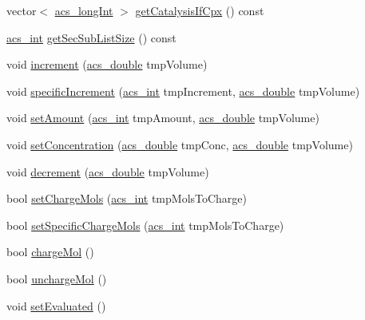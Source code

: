 \begin{DoxyCompactItemize}
vector$<$ \hyperlink{acs__headers_8h_a19319d75f02db4308bc5c0026d98cd85}{acs\-\_\-long\-Int} $>$ \hyperlink{classspecies_aaafd2738231ba916153e24c19e7b3bfc}{get\-Catalysis\-If\-Cpx} () const 
\item 
\hyperlink{acs__headers_8h_a8d277355641a098190360234e2ebde35}{acs\-\_\-int} \hyperlink{classspecies_a984df86838272204e7a8414bbc2a61fb}{get\-Sec\-Sub\-List\-Size} () const 
\item 
void \hyperlink{classspecies_a77f68017e5c50f8943df90efd2e8a0bb}{increment} (\hyperlink{acs__headers_8h_ab776853a005fcbf56af0424a2a4dd607}{acs\-\_\-double} tmp\-Volume)
\item 
void \hyperlink{classspecies_a87e85a2397e5ec34518efa235b529d7e}{specific\-Increment} (\hyperlink{acs__headers_8h_a8d277355641a098190360234e2ebde35}{acs\-\_\-int} tmp\-Increment, \hyperlink{acs__headers_8h_ab776853a005fcbf56af0424a2a4dd607}{acs\-\_\-double} tmp\-Volume)
\item 
void \hyperlink{classspecies_abefdc30b6f352e5ce5576a610015f5b8}{set\-Amount} (\hyperlink{acs__headers_8h_a8d277355641a098190360234e2ebde35}{acs\-\_\-int} tmp\-Amount, \hyperlink{acs__headers_8h_ab776853a005fcbf56af0424a2a4dd607}{acs\-\_\-double} tmp\-Volume)
\item 
void \hyperlink{classspecies_a018a8f55746849f4814b4d281d4aca5a}{set\-Concentration} (\hyperlink{acs__headers_8h_ab776853a005fcbf56af0424a2a4dd607}{acs\-\_\-double} tmp\-Conc, \hyperlink{acs__headers_8h_ab776853a005fcbf56af0424a2a4dd607}{acs\-\_\-double} tmp\-Volume)
\item 
void \hyperlink{classspecies_ae5142c6ab199459bc1d7d5945c761f0e}{decrement} (\hyperlink{acs__headers_8h_ab776853a005fcbf56af0424a2a4dd607}{acs\-\_\-double} tmp\-Volume)
\item 
bool \hyperlink{classspecies_a27f9852312659597efe7925124152286}{set\-Charge\-Mols} (\hyperlink{acs__headers_8h_a8d277355641a098190360234e2ebde35}{acs\-\_\-int} tmp\-Mols\-To\-Charge)
\item 
bool \hyperlink{classspecies_a088763fc6b6279040920d219f314c90e}{set\-Specific\-Charge\-Mols} (\hyperlink{acs__headers_8h_a8d277355641a098190360234e2ebde35}{acs\-\_\-int} tmp\-Mols\-To\-Charge)
\item 
bool \hyperlink{classspecies_adc36fb991695aed6503b8ed82e06bca5}{charge\-Mol} ()
\item 
bool \hyperlink{classspecies_acf8588148932adb86229eec28f7cde7c}{uncharge\-Mol} ()
\item 
void \hyperlink{classspecies_a089da38f8016bd588fa262cd836d1c4d}{set\-Evaluated} ()

\end{DoxyCompactItemize}
